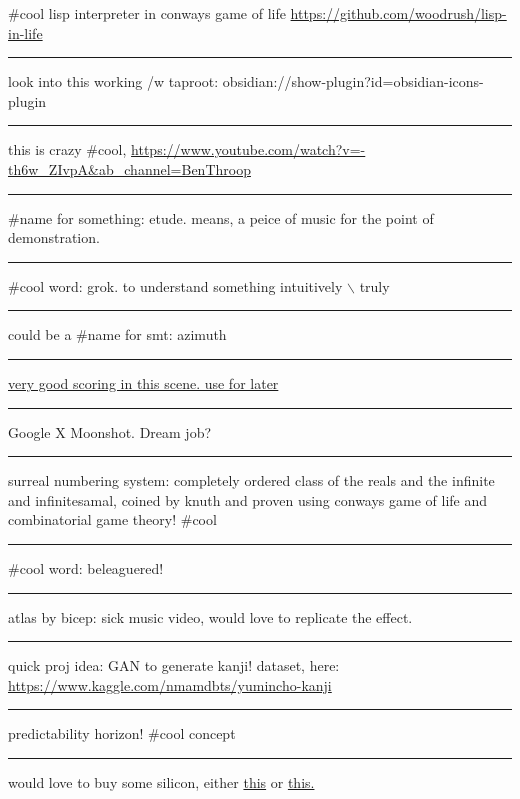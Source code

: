 \documentclass[letterpaper]{article}
\begin{document}
\#cool lisp interpreter in conways game of life
\url{https://github.com/woodrush/lisp-in-life}

\noindent\rule{\textwidth}{0.5pt}

look into this working /w taproot:
obsidian://show-plugin?id=obsidian-icons-plugin

\noindent\rule{\textwidth}{0.5pt}

this is crazy \#cool,
\url{https://www.youtube.com/watch?v=-th6w\_ZIvpA\&ab\_channel=BenThroop}

\noindent\rule{\textwidth}{0.5pt}

\#name for something: etude. means, a peice of music for the point of
demonstration.

\noindent\rule{\textwidth}{0.5pt}

\#cool word: grok. to understand something intuitively $\backslash$ truly

\noindent\rule{\textwidth}{0.5pt}

could be a \#name for smt: azimuth

\noindent\rule{\textwidth}{0.5pt}

\href{https://www.youtube.com/watch?v=uvap4gEOC5I\&ab\_channel=SonyPicturesHomeEntertainment}{very
good scoring in this scene. use for later}

\noindent\rule{\textwidth}{0.5pt}

Google X Moonshot. Dream job?

\noindent\rule{\textwidth}{0.5pt}

surreal numbering system: completely ordered class of the reals and the
infinite and infinitesamal, coined by knuth and proven using conways
game of life and combinatorial game theory! \#cool

\noindent\rule{\textwidth}{0.5pt}

\#cool word: beleaguered!

\noindent\rule{\textwidth}{0.5pt}

atlas by bicep: sick music video, would love to replicate the effect.

\noindent\rule{\textwidth}{0.5pt}

quick proj idea: GAN to generate kanji! dataset, here:
\url{https://www.kaggle.com/nmamdbts/yumincho-kanji}

\noindent\rule{\textwidth}{0.5pt}

predictability horizon! \#cool concept

\noindent\rule{\textwidth}{0.5pt}

would love to buy some silicon, either
\href{https://www.amazon.com/Silicon-Metal-99-999-Pure/dp/B08FVLJM8L}{this}
or
\href{https://www.amazon.com/Silicon-Wafer-Single-Sided-Polish/dp/B08RZ5ZYNF/}{this.}
\end{document}
